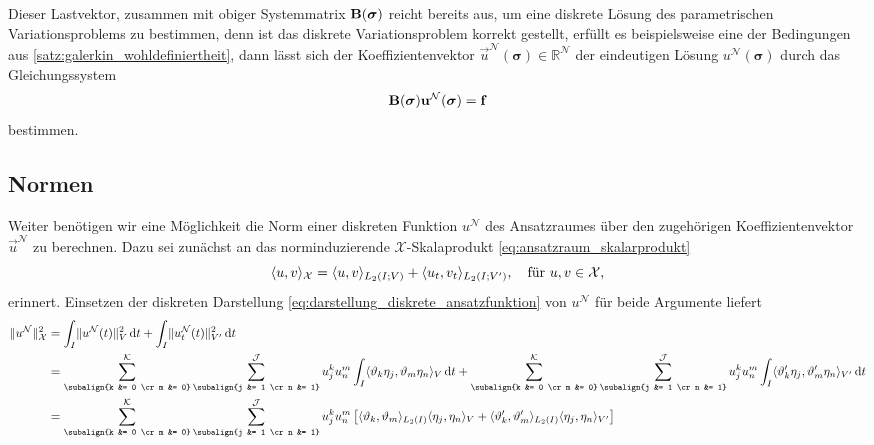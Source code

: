 \documentclass[../main.tex]{subfiles}
\begin{document}
Dieser Lastvektor, zusammen mit obiger Systemmatrix $\mathbf{B}(\bm \sigma)$ reicht bereits aus, um eine diskrete Lösung des parametrischen Variationsproblems zu bestimmen, denn ist das diskrete Variationsproblem korrekt gestellt, erfüllt es beispielsweise eine der Bedingungen aus \cref{satz:galerkin_wohldefiniertheit}, dann lässt sich der Koeffizientenvektor $\vec{u}^{\mathcal N}(\bm \sigma) \in \mathbb{R}^{\mathcal N}$ der eindeutigen Lösung $u^{\mathcal N}(\bm \sigma)$ durch das Gleichungssystem
\begin{equation}
    \mathbf{B}(\bm \sigma) \mathbf{u}^{\mathcal N}(\bm \sigma) = \mathbf{f}
\end{equation}
bestimmen.

\subsection*{Normen}

Weiter benötigen wir eine Möglichkeit die Norm einer diskreten Funktion $u^{\mathcal N}$ des Ansatzraumes über den zugehörigen Koeffizientenvektor $\vec{u}^{\mathcal N}$ zu berechnen.
Dazu sei zunächst an das norminduzierende $\mathcal X$-Skalaprodukt \cref{eq:ansatzraum_skalarprodukt}
\begin{equation}
    \langle u,v\rangle_{\mathcal X} = \langle u,v\rangle_{L_{2}(I; V)} + \langle u_t,v_t\rangle_{L_2(I; V')}, \quad \text{für } u, v \in \mathcal X,
\end{equation}
erinnert.
Einsetzen der diskreten Darstellung \cref{eq:darstellung_diskrete_ansatzfunktion} von $u^{\mathcal N}$ für beide Argumente liefert
\begin{align}
    \norm{u^{\mathcal N}}_{\mathcal X}^{2}
    &= \int_{I} \norm{u^{\mathcal N}(t)}^2_{V} \diff t
        + \int_{I} \norm{u^{\mathcal N}_{t}(t)}_{V'}^2 \diff t
    \\&= \sum_{\subalign{k &= 0 \cr m &= 0}}^{\mathcal K} \sum_{\subalign{j &= 1 \cr n &= 1}}^{\mathcal J} u^{k}_{j} u^{m}_{n} \int_{I} \skp{\theta_{k} \eta_{j}}{\theta_{m} \eta_{n}}{V} \diff t
        + \sum_{\subalign{k &= 0 \cr m &= 0}}^{\mathcal K} \sum_{\subalign{j &= 1 \cr n &= 1}}^{\mathcal J} u^{k}_{j} u^{m}_{n} \int_{I} \skp{\theta_{k}' \eta_{j}}{\theta_{m}' \eta_{n}}{V'} \diff t
    \\&= \sum_{\subalign{k &= 0 \cr m &= 0}}^{\mathcal K} \sum_{\subalign{j &= 1 \cr n &= 1}}^{\mathcal J} u^{k}_{j} u^{m}_{n} \left[ \skp{\theta_{k}}{\theta_{m}}{L_{2}(I)} \skp{\eta_{j}}{\eta_{n}}{V} + \skp{\theta_{k}'}{\theta_{m}'}{L_{2}(I)} \skp{\eta_{j}}{\eta_{n}}{V'} \right]
\end{align}
\end{document}
